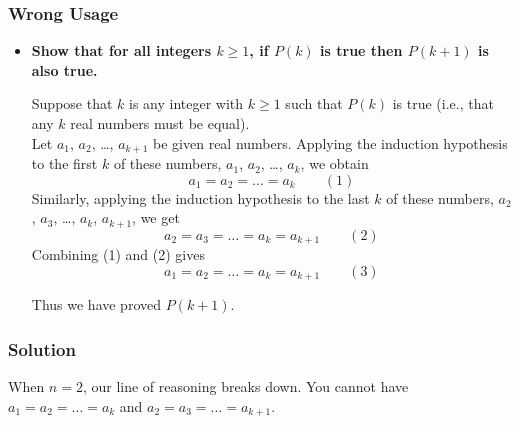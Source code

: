 \documentclass{beamer}
\newcounter{exo}
\newcommand{\exo}{
  \addtocounter{exo}{1}
  Exercice \arabic{exo}
}
\begin{document}
\begin{frame}%
\frametitle{Wrong Usage}


\scriptsize

\begin{itemize}

\item \textbf{Show that for all integers $k \ge 1$, if $P(k)$ is true then $P(k+1)$ is also true.}\\
\vspace{0.2cm}

Suppose that $k$ is any integer with $k \ge 1$ such that $P(k)$ is true (i.e., that any $k$ real numbers must be equal).\\

\vspace{0.2cm}
Let $a_1$, $a_2$, \ldots, $a_{k+1}$ be given real numbers. Applying the induction hypothesis to the first $k$
of these numbers, $a_1$, $a_2$, \ldots, $a_k$, we obtain\\
$$
a_1 = a_2 = \ldots = a_k \qquad (1)
$$
Similarly, applying the induction hypothesis to the last $k$ of these numbers, $a_2$, $a_3$, \ldots, $a_k$, $a_{k+1}$, we get\\
$$
a_2 = a_3 = \ldots = a_k = a_{k+1} \qquad (2)
$$
Combining (1) and (2) gives\\
$$
a_1 = a_2 = \ldots = a_k = a_{k+1} \qquad (3)
$$

Thus we have proved $P(k+1)$.

\end{itemize}

\end{frame}


\ifanswers

\begin{frame}%
\frametitle{Solution}

When $n = 2$, our line of reasoning breaks down. You cannot have $a_1 = a_2 = \ldots = a_k$ and $a_2 = a_3 = \ldots = a_{k+1}$.

\end{frame}
\end{document}
